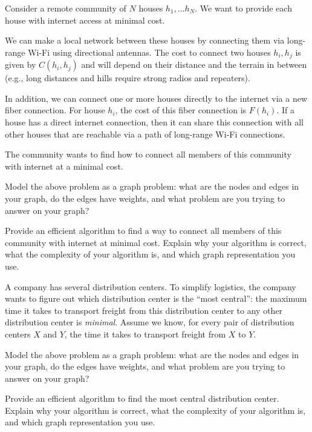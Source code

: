 


\maketitle
\DEFAULTMSG{}

\begin{problem}
Consider a remote community of $N$ houses $h_1, \dots h_N$. We want to provide each house with internet access at minimal cost.

We can make a local network between these houses by connecting them via long-range Wi-Fi using directional antennas. The cost to connect two houses $h_i, h_j$ is given by $C(h_i, h_j)$ and will depend on their distance and the terrain in between (e.g., long distances and hills require strong radios and repeaters).

In addition, we can connect one or more houses directly to the internet via a new fiber connection.  For house $h_i$, the cost of this fiber connection is $F(h_i)$. If a house has a direct internet connection, then it can share this connection with all other houses that are reachable via a path of long-range Wi-Fi connections.

The community wants to find how to connect all members of this community with internet at a minimal cost.
\begin{questions}
\item Model the above problem as a graph problem: what are the nodes and edges in your graph, do the edges have weights, and what problem are you trying to answer on your graph?
\item Provide an efficient algorithm to find a way to connect all members of this community with internet at minimal cost. Explain why your algorithm is correct, what the complexity of your algorithm is, and which graph representation you use.
\end{questions}
\end{problem}

\begin{problem}
A company has several distribution centers. To simplify logistics, the company wants to figure out which distribution center is the ``most central'': the maximum time it takes to transport freight from this distribution center to any other distribution center is \emph{minimal}. Assume we know, for every pair of distribution centers $X$ and $Y$, the time it takes to transport freight from $X$ to $Y$.
\begin{questions}
\item Model the above problem as a graph problem: what are the nodes and edges in your graph, do the edges have weights, and what problem are you trying to answer on your graph?
\item Provide an efficient algorithm to find the most central distribution center. Explain why your algorithm is correct, what the complexity of your algorithm is, and which graph representation you use.
\end{questions}
\end{problem}


